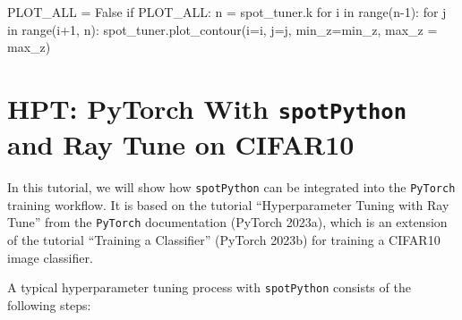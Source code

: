 \documentclass[
  letterpaper,
  DIV=11,
  numbers=noendperiod]{scrreprt}
\newenvironment{Shaded}{\begin{snugshade}}{\end{snugshade}}
\newcommand{\BuiltInTok}[1]{\textcolor[rgb]{0.00,0.23,0.31}{#1}}
\newcommand{\ControlFlowTok}[1]{\textcolor[rgb]{0.00,0.23,0.31}{#1}}
\newcommand{\DecValTok}[1]{\textcolor[rgb]{0.68,0.00,0.00}{#1}}
\newcommand{\KeywordTok}[1]{\textcolor[rgb]{0.00,0.23,0.31}{#1}}
\newcommand{\NormalTok}[1]{\textcolor[rgb]{0.00,0.23,0.31}{#1}}
\newcommand{\OperatorTok}[1]{\textcolor[rgb]{0.37,0.37,0.37}{#1}}
\newcommand{\VariableTok}[1]{\textcolor[rgb]{0.07,0.07,0.07}{#1}}
\begin{document}
\begin{Shaded}
\begin{Highlighting}[]
\NormalTok{PLOT\_ALL }\OperatorTok{=} \VariableTok{False}
\ControlFlowTok{if}\NormalTok{ PLOT\_ALL:}
\NormalTok{    n }\OperatorTok{=}\NormalTok{ spot\_tuner.k}
    \ControlFlowTok{for}\NormalTok{ i }\KeywordTok{in} \BuiltInTok{range}\NormalTok{(n}\OperatorTok{{-}}\DecValTok{1}\NormalTok{):}
        \ControlFlowTok{for}\NormalTok{ j }\KeywordTok{in} \BuiltInTok{range}\NormalTok{(i}\OperatorTok{+}\DecValTok{1}\NormalTok{, n):}
\NormalTok{            spot\_tuner.plot\_contour(i}\OperatorTok{=}\NormalTok{i, j}\OperatorTok{=}\NormalTok{j, min\_z}\OperatorTok{=}\NormalTok{min\_z, max\_z }\OperatorTok{=}\NormalTok{ max\_z)}
\end{Highlighting}
\end{Shaded}

\hypertarget{sec-hyperparameter-tuning-for-pytorch-14}{%
\chapter{\texorpdfstring{HPT: PyTorch With \texttt{spotPython} and Ray
Tune on
CIFAR10}{HPT: PyTorch With spotPython and Ray Tune on CIFAR10}}\label{sec-hyperparameter-tuning-for-pytorch-14}}

In this tutorial, we will show how \texttt{spotPython} can be integrated
into the \texttt{PyTorch} training workflow. It is based on the tutorial
``Hyperparameter Tuning with Ray Tune'' from the \texttt{PyTorch}
documentation (PyTorch 2023a), which is an extension of the tutorial
``Training a Classifier'' (PyTorch 2023b) for training a CIFAR10 image
classifier.

A typical hyperparameter tuning process with \texttt{spotPython}
consists of the following steps:
\end{document}
